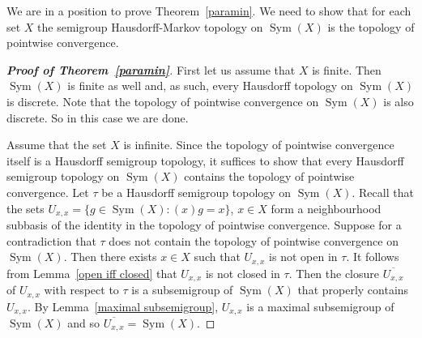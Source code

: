 \documentclass[11pt]{amsart}
\newtheorem{theorem}{Theorem}[section]
\theoremstyle{definition}
\newcommand{\N}{\mathbb N}
\newcommand{\Sym}{\operatorname{Sym}}
\newcommand{\set}[2]{\{#1:#2\}}
\begin{document}
We are in a position to prove Theorem~\ref{paramin}. We need to show that for each set $X$ the semigroup Hausdorff-Markov topology on $\Sym(X)$ is the topology of pointwise convergence.


\begin{proof}[{\bf Proof of Theorem~\ref{paramin}}]
First let us assume that $X$ is finite.
Then $\Sym(X)$ is finite as well and, as such, every Hausdorff topology on $\Sym(X)$ is discrete. Note that the topology of pointwise convergence on $\Sym(X)$ is also discrete. So in this case we are done. 

Assume that the set $X$ is infinite.
Since the topology of pointwise convergence itself is a Hausdorff semigroup topology, it suffices to show that every Hausdorff semigroup topology on \(\Sym(X)\) contains the topology of pointwise convergence. 
Let \(\tau\) be a Hausdorff semigroup topology on \(\Sym(X)\). Recall that the sets $U_{x,x}=\set{g \in \Sym(X)}{(x)g=x}$, $x\in X$ form a neighbourhood subbasis of the identity in the topology of pointwise convergence. 
Suppose for a contradiction that $\tau$ does not contain the topology of pointwise convergence on $\Sym(X)$. Then there exists \(x\in X\) such that $U_{x,x}$ is not open in $\tau$.
It follows from Lemma~\ref{open iff closed} that \(U_{x,x}\) is not closed in $\tau$. 
Then the closure $\overline{U_{x,x}}$ of $U_{x,x}$ with respect to $\tau$ is a subsemigroup of $\Sym(X)$ that properly contains $U_{x,x}$.
By Lemma~\ref{maximal subsemigroup}, $U_{x,x}$ is a maximal subsemigroup of $\Sym(X)$ and so \(\overline{U_{x,x}}= \Sym(X)\).


\end{proof}
\end{document}
